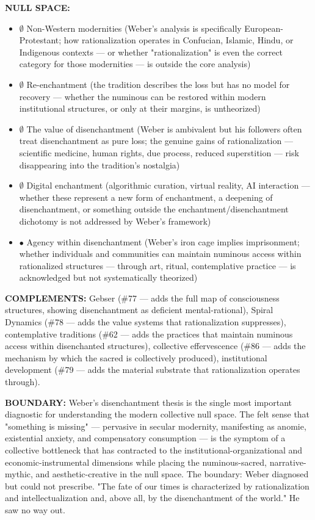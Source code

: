 \textbf{NULL SPACE:}

\begin{itemize}[nosep,leftmargin=*]
  \item $\emptyset$ Non-Western modernities (Weber's analysis is specifically European-Protestant; how rationalization operates in Confucian, Islamic, Hindu, or Indigenous contexts — or whether "rationalization" is even the correct category for those modernities — is outside the core analysis)
  \item $\emptyset$ Re-enchantment (the tradition describes the loss but has no model for recovery — whether the numinous can be restored within modern institutional structures, or only at their margins, is untheorized)
  \item $\emptyset$ The value of disenchantment (Weber is ambivalent but his followers often treat disenchantment as pure loss; the genuine gains of rationalization — scientific medicine, human rights, due process, reduced superstition — risk disappearing into the tradition's nostalgia)
  \item $\emptyset$ Digital enchantment (algorithmic curation, virtual reality, AI interaction — whether these represent a new form of enchantment, a deepening of disenchantment, or something outside the enchantment/disenchantment dichotomy is not addressed by Weber's framework)
  \item $\bullet$ Agency within disenchantment (Weber's iron cage implies imprisonment; whether individuals and communities can maintain numinous access within rationalized structures — through art, ritual, contemplative practice — is acknowledged but not systematically theorized)
\end{itemize}


\textbf{COMPLEMENTS:} Gebser (\#77 — adds the full map of consciousness structures, showing disenchantment as deficient mental-rational), Spiral Dynamics (\#78 — adds the value systems that rationalization suppresses), contemplative traditions (\#62 — adds the practices that maintain numinous access within disenchanted structures), collective effervescence (\#86 — adds the mechanism by which the sacred is collectively produced), institutional development (\#79 — adds the material substrate that rationalization operates through).


\textbf{BOUNDARY:} Weber's disenchantment thesis is the single most important diagnostic for understanding the modern collective null space. The felt sense that "something is missing" — pervasive in secular modernity, manifesting as anomie, existential anxiety, and compensatory consumption — is the symptom of a collective bottleneck that has contracted to the institutional-organizational and economic-instrumental dimensions while placing the numinous-sacred, narrative-mythic, and aesthetic-creative in the null space. The boundary: Weber diagnosed but could not prescribe. "The fate of our times is characterized by rationalization and intellectualization and, above all, by the disenchantment of the world." He saw no way out.


